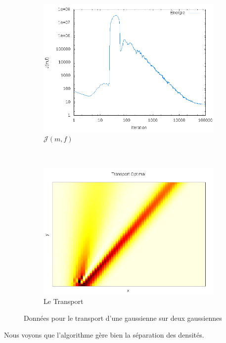 \documentclass[a4paper,12pt]{article}
\begin{document}
\begin{figure}[!h]
	\begin{subfigure}[b]{0.48\linewidth}
	\includegraphics[width=\textwidth]{img/1DMixture/energie.png}
	\caption{$\mathcal{J}(m,f)$}
	\end{subfigure}
	~
	\begin{subfigure}[b]{0.48\linewidth}
	\includegraphics[width=\textwidth]{img/1DMixture/transport.png}
	\caption{Le Transport}
	\end{subfigure}	
	\caption{Données pour le transport d'une gaussienne sur deux gaussiennes}
\end{figure}

Nous voyons que l'algorithme gère bien la séparation des densités. 
\end{document}
